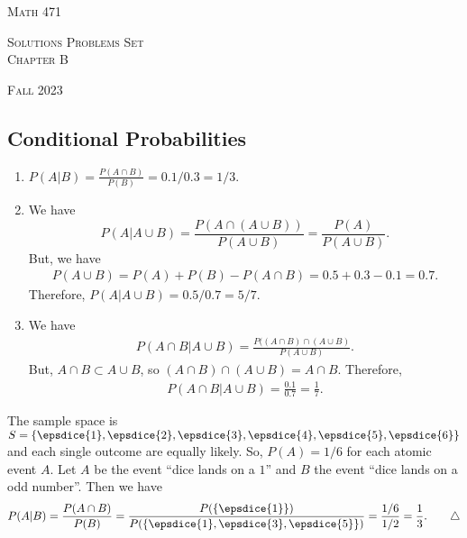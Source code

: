 


\hrulefill

\begin{minipage}{0.33\textwidth}
\textsc{Math 471}
\end{minipage} \hfill 
\begin{minipage}{0.32\textwidth}
\centering
\textsc{Solutions Problems Set} \\
\textsc{Chapter B}
\end{minipage}
\hfill 
\begin{minipage}{0.33\textwidth}
\flushright \textsc{Fall 2023}
\end{minipage}

\hrulefill

\setcounter{section}{2}

\subsection{Conditional Probabilities}
	
	\begin{problem}
	\begin{enumerate}[label=\alph*)]
	\item $P (A |B) = \frac{P (A \cap B)}{P (B)} = 0.1 / 0.3 = 1/3$.
	\item We have
		$$
		P (A | A \cup B) = \frac{P (A \cap (A \cup B))}{P (A \cup B)} = \frac{P (A)}{P (A \cup B)}.
		$$
	But, we have
		\begin{align*}
		P (A \cup B) = P (A) + P (B) - P (A \cap B) = 0.5 + 0.3 - 0.1 = 0.7 .
		\end{align*}
	Therefore, $P (A | A \cup B) = 0.5 / 0.7 = 5/7$.
	\item We have
		\begin{align*}
		P (A \cap B | A \cup B) = \frac{P ((A \cap B) \cap (A \cup B)}{P (A \cup B)}. 
		\end{align*}
	But, $A \cap B \subset A \cup B$, so $(A \cap B) \cap (A \cup B) = A \cap B$. Therefore, 
		\begin{align*}
		P (A \cap B | A \cup B) = \frac{0.1}{0.7} = \frac{1}{7} . \tag*{$\triangle$}
		\end{align*}
	\end{enumerate}		
	\end{problem}

	\begin{problem}
	The sample space is $S = \{ \epsdice{1} , \epsdice{2} , \epsdice{3} , \epsdice{4} , \epsdice{5} , \epsdice{6} \}$ and each single outcome are equally likely. So, $P (A) = 1/6$ for each atomic event $A$. Let $A$ be the event ``dice lands on a $1$'' and $B$ the event ``dice lands on a odd number''. Then we have
		\begin{align*}
		P (A |B ) = \frac{P (A \cap B)}{P (B)} = \frac{P (\{ \epsdice{1} \})}{P (\{ \epsdice{1} , \epsdice{3} , \epsdice{5} \})} = \frac{1/6}{1/2} = \frac{1}{3} . \tag*{$\triangle$}
		\end{align*}
	\end{problem}

